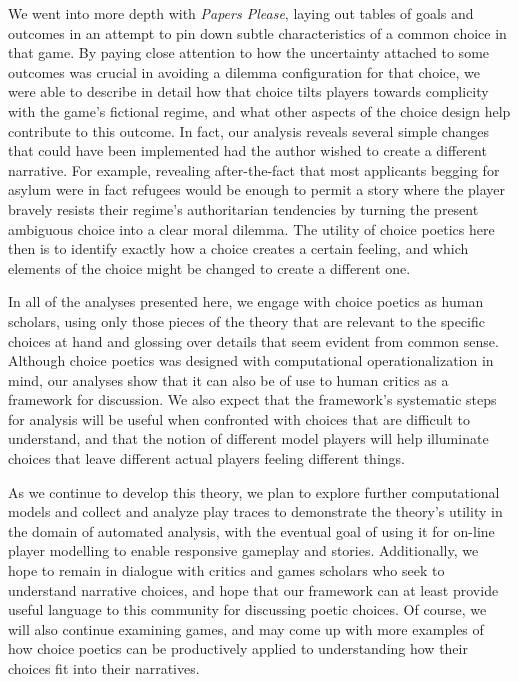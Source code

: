 \documentclass[arts,article,submit,moreauthors,pdftex,10pt,a4paper]{Definitions/mdpi}
\begin{document}
We went into more depth with \emph{Papers Please}, laying out tables of goals and outcomes in an attempt to pin down subtle characteristics of a common choice in that game.
%
By paying close attention to how the uncertainty attached to some outcomes was crucial in avoiding a dilemma configuration for that choice, we were able to describe in detail how that choice tilts players towards complicity with the game's fictional regime, and what other aspects of the choice design help contribute to this outcome.
%
In fact, our analysis reveals several simple changes that could have been implemented had the author wished to create a different narrative.
%
For example, revealing after-the-fact that most applicants begging for asylum were in fact refugees would be enough to permit a story where the player bravely resists their regime's authoritarian tendencies by turning the present ambiguous choice into a clear moral dilemma.
%
The utility of choice poetics here then is to identify exactly how a choice creates a certain feeling, and which elements of the choice might be changed to create a different one.


In all of the analyses presented here, we engage with choice poetics as human scholars, using only those pieces of the theory that are relevant to the specific choices at hand and glossing over details that seem evident from common sense.
%
Although choice poetics was designed with computational operationalization in mind, our analyses show that it can also be of use to human critics as a framework for discussion.
%
We also expect that the framework's systematic steps for analysis will be useful when confronted with choices that are difficult to understand, and that the notion of different model players will help illuminate choices that leave different actual players feeling different things.


As we continue to develop this theory, we plan to explore further computational models and collect and analyze play traces to demonstrate the theory's utility in the domain of automated analysis, with the eventual goal of using it for on-line player modelling to enable responsive gameplay and stories.
%
Additionally, we hope to remain in dialogue with critics and games scholars who seek to understand narrative choices, and hope that our framework can at least provide useful language to this community for discussing poetic choices.
%
Of course, we will also continue examining games, and may come up with more examples of how choice poetics can be productively applied to understanding how their choices fit into their narratives.
\end{document}
